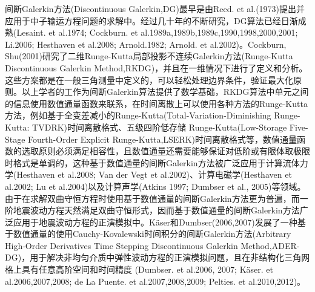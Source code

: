 \documentclass[12pt]{article}
\newcommand{\upcite}[1]{\textsuperscript{\textsuperscript{\cite{#1}}}}
\begin{document}
\par
间断Galerkin方法(Discontinuous Galerkin,DG)最早是由Reed. et al.(1973)提出并应用于中子输运方程问题的求解中\upcite{Reed1973}。经过几十年的不断研究，DG算法已经日渐成熟(Lesaint. et al.1974; Cockburn. et al.1989a,1989b,1989c,1990,1998,2000,2001; Li.2006; Hesthaven et al.2008; Arnold.1982; Arnold. et al.2002)\upcite{Lesaint1974,Cockburn1989a,Cockburn1989b,Cockburn1989c,
Cockburn1990,Cockburn1998,Cockburn2000,Cockburn2001,
Li2006,Hesthaven2008,Arnold1982,Arnold2002}。Cockburn, Shu(2001)研究了二维Runge-Kutta局部投影不连续Galerkin方法(Runge-Kutta Discontinuous Galerkin Method,RKDG)，并且在一维情况下进行了定义和分析。这些方案都是在一般三角测量中定义的，可以轻松处理边界条件，验证最大化原则。以上学者的工作为间断Galerkin算法提供了数学基础，RKDG算法中单元之间的信息使用数值通量函数来联系，在时间离散上可以使用各种方法的Runge-Kutta方法，例如基于全变差减小的Runge-Kutta(Total-Variation-Diminishing Runge-Kutta: TVDRK)时间离散格式、五级四阶低存储 Runge-Kutta(Low-Storage Five-Stage Fourth-Order Explicit Runge-Kutta,LSERK)时间离散格式等，数值通量函数的选取原则必须满足相容性，且数值通量还需要能够保证对低阶或有限体取极限时格式是单调的，这种基于数值通量的间断Galerkin方法被广泛应用于计算流体力学(Hesthaven et al.2008; Van der Vegt et al.2002)\upcite{Hesthaven2008,van2002}、计算电磁学(Hesthaven et al.2002; Lu et al.2004)\upcite{Hesthaven2002,Lu2004}以及计算声学(Atkins 1997; Dumbser et al., 2005)等领域\upcite{Atkins1997,Dumbser2005}。由于在求解双曲守恒方程时使用基于数值通量的间断Galerkin方法更为普遍，而一阶地震波动方程天然满足双曲守恒形式，因而基于数值通量的间断Galerkin方法广泛应用于地震波动方程的正演模拟中。Käser和Dumbser(2006,2007)发展了一种基于数值通量的使用Cauchy-Kovalewski时间积分的间断Galerkin方法(Arbitrary High-Order Derivatives Time Stepping Discontinuous Galerkin Method,ADER-DG)，用于解决非均匀介质中弹性波动方程的正演模拟问题，且在非结构化三角网格上具有任意高阶空间和时间精度 (Dumbser. et al.2006, 2007; Käser. et al.2006,2007,2008; de La Puente. et al.2007,2008,2009; Pelties. et al.2010,2012)\upcite{Dumbser2006,Dumbser2007,Käser2006,Käser2007,Käser2008,Pelties2010,Pelties2012}。
\end{document}
